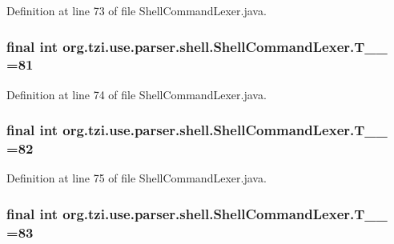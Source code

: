Definition at line 73 of file Shell\-Command\-Lexer.\-java.

\hypertarget{classorg_1_1tzi_1_1use_1_1parser_1_1shell_1_1_shell_command_lexer_a8a0bca9518a6eae9445a2af7c0723360}{
\subsubsection[{T\-\_\-\-\_\-81}]{\setlength{\rightskip}{0pt plus 5cm}final int org.\-tzi.\-use.\-parser.\-shell.\-Shell\-Command\-Lexer.\-T\-\_\-\-\_ =81\hspace{0.3cm}{\ttfamily [static]}}}\label{classorg_1_1tzi_1_1use_1_1parser_1_1shell_1_1_shell_command_lexer_a8a0bca9518a6eae9445a2af7c0723360}


Definition at line 74 of file Shell\-Command\-Lexer.\-java.

\hypertarget{classorg_1_1tzi_1_1use_1_1parser_1_1shell_1_1_shell_command_lexer_afcbd0c02b466cddd60e4159f4e2fcb2e}{
\subsubsection[{T\-\_\-\-\_\-82}]{\setlength{\rightskip}{0pt plus 5cm}final int org.\-tzi.\-use.\-parser.\-shell.\-Shell\-Command\-Lexer.\-T\-\_\-\-\_ =82\hspace{0.3cm}{\ttfamily [static]}}}\label{classorg_1_1tzi_1_1use_1_1parser_1_1shell_1_1_shell_command_lexer_afcbd0c02b466cddd60e4159f4e2fcb2e}


Definition at line 75 of file Shell\-Command\-Lexer.\-java.

\hypertarget{classorg_1_1tzi_1_1use_1_1parser_1_1shell_1_1_shell_command_lexer_a25050dfe2e278ac220c759c2d4899937}{
\subsubsection[{T\-\_\-\-\_\-83}]{\setlength{\rightskip}{0pt plus 5cm}final int org.\-tzi.\-use.\-parser.\-shell.\-Shell\-Command\-Lexer.\-T\-\_\-\-\_ =83\hspace{0.3cm}{\ttfamily [static]}}}\label{classorg_1_1tzi_1_1use_1_1parser_1_1shell_1_1_shell_command_lexer_a25050dfe2e278ac220c759c2d4899937}


